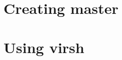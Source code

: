 \documentclass[a4paper]{book}
\begin{document}
\chapter{Creating master}\label{creating_master}

\chapter{Using virsh}
\end{document}
